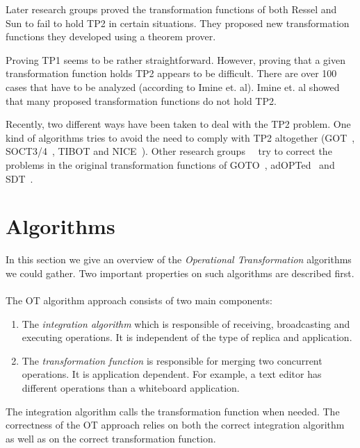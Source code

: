 \documentclass[11pt,a4paper]{article}
\begin{document}
Later research groups\cite{imine03}\cite{imine04} proved the transformation functions of both Ressel\cite{ressel96} and Sun\cite{sun98a} to fail to hold TP2 in certain situations. They proposed new transformation functions they developed using a theorem prover. 

Proving TP1 seems to be rather straightforward. However, proving that a given transformation function holds TP2 appears to be difficult. There are over 100 cases that have to be analyzed (according to {Imine et. al}\cite{imine04}). Imine et. al showed that many proposed transformation functions do not hold TP2. 

Recently, two different ways have been taken to deal with the TP2 problem. One kind of algorithms tries to avoid the need to comply with TP2 altogether (GOT~\cite{sun98a}, SOCT3/4~\cite{suleiman00}, TIBOT\cite{tibot} and NICE~\cite{sun02}). Other research groups~\cite{li04}~\cite{imine04} try to correct the problems in the original transformation functions of GOTO~\cite{sun98b}, adOPTed~\cite{ressel96} and SDT~\cite{sdt}. 


\section{Algorithms}
\label{algos}
In this section we give an overview of the \emph{Operational Transformation} algorithms we could gather. Two important properties on such algorithms are described first.

\paragraph{} The OT algorithm approach consists of two main components:

\begin{enumerate}
 \item The \emph{integration algorithm} which is responsible of receiving, broadcasting and executing operations. It is independent of the type of replica and application.
 \item The \emph{transformation function} is responsible for merging two concurrent operations. It is application dependent. For example, a text editor has different operations than a whiteboard application.
\end{enumerate}

The integration algorithm calls the transformation function when needed. The correctness of the OT approach relies on both the correct integration algorithm as well as on the correct transformation function.
\end{document}
